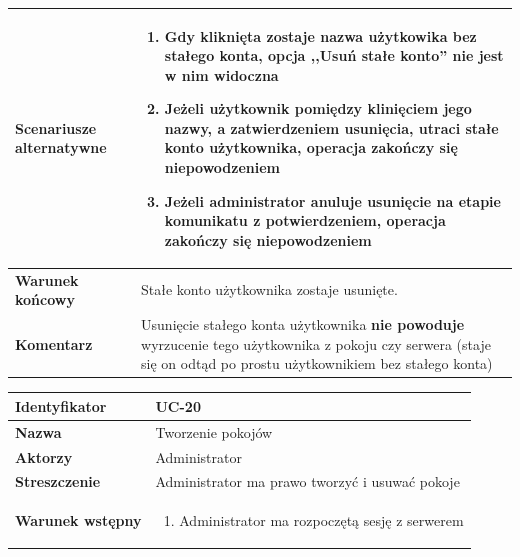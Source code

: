 \documentclass[11pt,oneside,a4paper,titlepage,onecolumn]{article}
\newenvironment{enumreq}
{ \begin{enumerate}[topsep=0pt,itemsep=-1ex,partopsep=1ex,parsep=1ex] }
{ \end{enumerate}                  }
\begin{document}
{\begin{tabular}{ | l | l | }
	\hline
		\parbox[t]{4cm}{\textbf{Scenariusze alternatywne}} & \parbox[t]
		{11cm}{
			\begin{enumreq}
				\item Gdy kliknięta zostaje nazwa użytkowika bez stałego
				konta, opcja ,,Usuń stałe konto'' nie jest w nim widoczna
				\item Jeżeli użytkownik pomiędzy klinięciem jego nazwy,
				a zatwierdzeniem usunięcia, utraci stałe konto użytkownika,
				operacja zakończy się niepowodzeniem
				\item Jeżeli administrator anuluje usunięcie na etapie
				komunikatu z potwierdzeniem, operacja zakończy się
				niepowodzeniem 
			\end{enumreq}
		}
		\\
		
	\hline
		\parbox[t]{4cm}{\textbf{Warunek końcowy}} & \parbox[t]{11cm}{
			Stałe konto użytkownika zostaje usunięte.
		}
		\\
		
	\hline
		\parbox[t]{4cm}{\textbf{Komentarz}} & \parbox[t]{11cm}{
			Usunięcie stałego konta użytkownika \textbf{nie powoduje}
			wyrzucenie tego użytkownika z pokoju czy serwera (staje
			się on odtąd po prostu użytkownikiem bez stałego konta)
		}
		\\

	\hline
\end{tabular}

\vspace{2em}

\begin{tabular}{ | l | l | }
	\hline
		\textbf{Identyfikator} & 
		UC-20
		\\
		
	\hline
		\textbf{Nazwa} & 
		Tworzenie pokojów
		\\
		
	\hline
		\textbf{Aktorzy} & \parbox[t]{11cm}{
			Administrator
		}\\
		 
	\hline
		\parbox[t]{4cm}{\textbf{Streszczenie}} & \parbox[t]{11cm}{
			Administrator ma prawo tworzyć i usuwać pokoje 
			
		}\\
		
	\hline
		\parbox[t]{4cm}{\textbf{Warunek wstępny}} & \parbox[t]{11cm}{
			\begin{enumreq}
				\item Administrator ma rozpoczętą sesję z serwerem
			\end{enumreq}
				
}
\end{tabular}}
\end{document}
